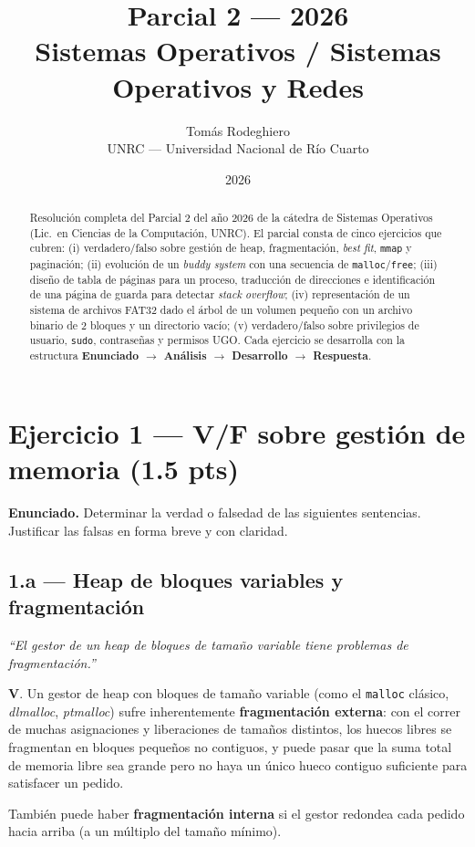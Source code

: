 \documentclass[11pt,a4paper]{article}
\title{
    \vspace{-2.5em}
    \textbf{Parcial 2 --- 2026} \\[0.3em]
    \large Sistemas Operativos / Sistemas Operativos y Redes
}
\author{
    Tomás Rodeghiero \\
    \small UNRC --- Universidad Nacional de Río Cuarto
}
\date{2026}
\begin{document}
\maketitle

\begin{abstract}
\noindent
Resolución completa del Parcial 2 del año 2026 de la cátedra de
Sistemas Operativos (Lic.\ en Ciencias de la Computación, UNRC). El
parcial consta de cinco ejercicios que cubren: (i) verdadero/falso
sobre gestión de heap, fragmentación, \emph{best fit}, \texttt{mmap}
y paginación; (ii) evolución de un \emph{buddy system} con una
secuencia de \texttt{malloc}/\texttt{free}; (iii) diseño de tabla de
páginas para un proceso, traducción de direcciones e identificación de
una página de guarda para detectar \emph{stack overflow}; (iv)
representación de un sistema de archivos FAT32 dado el árbol de un
volumen pequeño con un archivo binario de 2 bloques y un directorio
vacío; (v) verdadero/falso sobre privilegios de usuario, \texttt{sudo},
contraseñas y permisos UGO. Cada ejercicio se desarrolla con la
estructura \textbf{Enunciado $\to$ Análisis $\to$ Desarrollo $\to$
Respuesta}.
\end{abstract}

\tableofcontents
\bigskip

\section{Ejercicio 1 --- V/F sobre gestión de memoria (1.5 pts)}

\textbf{Enunciado.} Determinar la verdad o falsedad de las siguientes
sentencias. Justificar las falsas en forma breve y con claridad.

\subsection*{1.a --- Heap de bloques variables y fragmentación}

\emph{``El gestor de un heap de bloques de tamaño variable tiene
problemas de fragmentación.''}

\begin{respuesta}
\textbf{V}. Un gestor de heap con bloques de tamaño variable (como el
\texttt{malloc} clásico, \emph{dlmalloc}, \emph{ptmalloc}) sufre
inherentemente \textbf{fragmentación externa}: con el correr de
muchas asignaciones y liberaciones de tamaños distintos, los huecos
libres se fragmentan en bloques pequeños no contiguos, y puede pasar
que la suma total de memoria libre sea grande pero no haya un único
hueco contiguo suficiente para satisfacer un pedido.

También puede haber \textbf{fragmentación interna} si el gestor
redondea cada pedido hacia arriba (a un múltiplo del tamaño mínimo).
\end{respuesta}
\end{document}
